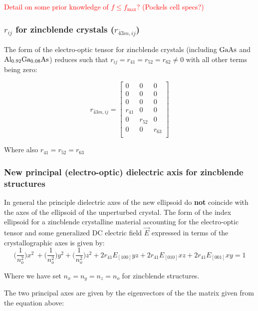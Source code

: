 \noindent \textcolor{red}{Detail on some prior knowledge of $f \leq f_\mathrm{max}$? (Pockels cell specs?)}


\subsubsection{$r_{ij}$ for zincblende crystals ($r_{\bar{4}3m, ij}$)}

The form of the electro-optic tensor for zincblende crystals (including $\mathrm{GaAs}$ and $\mathrm{Al_{0.92}Ga_{0.08}As}$) reduces such that $r_{ij} = r_{41} = r_{52} = r_{62} \neq 0$ with all other terms being zero:

\begin{equation}
r_{\bar{4}3m,ij} =
 \left[ {\begin{array}{ccc}
  0 & 0 & 0\\
  0 & 0 & 0\\
  0 & 0 & 0\\
  r_{41} & 0 & 0\\
  0 & r_{52} & 0\\
  0 & 0 & r_{63}\\
 \end{array}} \right]
\end{equation}

\noindent Where also $r_{41} = r_{52} = r_{63}$

\subsubsection{New principal (electro-optic) dielectric axis for zincblende structures}

In general the principle dielectric axes of the new ellipsoid do \textbf{not} coincide with the axes of the ellipsoid of the unperturbed crystal. The form of the index ellipsoid for a zincblende crystalline material accounting for the electro-optic tensor and some generalized DC electric field $\vec{E}$ expressed in terms of the crystallographic axes is given by:
\begin{equation}\label{eq:zindicatrix}
\bigg(\frac{1}{n_o^2} \bigg) x^2\ + \bigg(\frac{1}{n_o^2} \bigg) y^2 + \bigg(\frac{1}{n_o^2} \bigg) z^2  + 2r_{41} E_{[100]} yz + 2r_{41} E_{[010]} xz + 2r_{41}E_{[001]} xy= 1
\end{equation}

\noindent Where we have set $n_x = n_y = n_z = n_o$ for zincblende structures.

\noindent The two principal axes are given by the eigenvectors of the the matrix given from the equation above:

